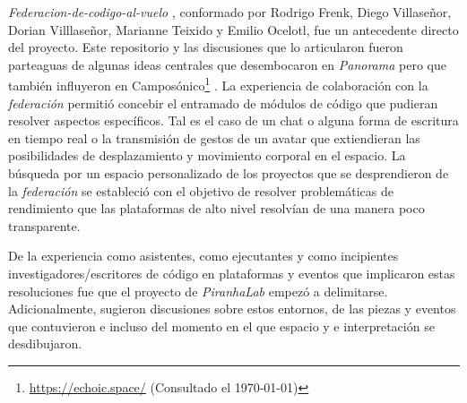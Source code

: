 \textit{Federacion-de-codigo-al-vuelo} \citep{en-vivo}, conformado por Rodrigo Frenk, Diego Villaseñor, Dorian Villlaseñor, Marianne Teixido y Emilio Ocelotl, fue un antecedente directo del proyecto. Este repositorio y las discusiones que lo articularon fueron parteaguas de algunas ideas centrales que desembocaron en \textit{Panorama} pero que también influyeron en Camposónico\footnote{\url{https://echoic.space/} (Consultado el \today)} \citep{camposonico}. La experiencia de colaboración con la \textit{federación} permitió concebir el entramado de módulos de código que pudieran resolver aspectos específicos. Tal es el caso de un chat o alguna forma de escritura en tiempo real o la transmisión de gestos de un avatar que extiendieran las posibilidades de desplazamiento y movimiento corporal en el espacio. La búsqueda por un espacio personalizado de los proyectos que se desprendieron de la \textit{federación} se estableció con el objetivo de resolver problemáticas de rendimiento que las plataformas de alto nivel resolvían de una manera poco transparente. 



De la experiencia como asistentes, como ejecutantes y como incipientes investigadores/escritores de código en plataformas y eventos que implicaron estas resoluciones fue que el proyecto de \textit{PiranhaLab} empezó a delimitarse. Adicionalmente, sugieron discusiones sobre estos entornos, de las piezas y eventos que contuvieron e incluso del momento en el que espacio y e interpretación se desdibujaron. 
